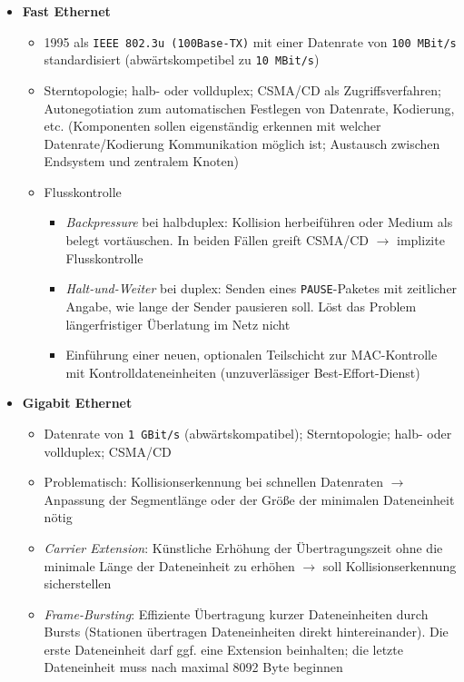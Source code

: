 \begin{itemize}
	\item \textbf{Fast Ethernet}
	\begin{itemize}
		\item 1995 als \texttt{IEEE 802.3u (100Base-TX)} mit einer Datenrate von \texttt{100 MBit/s} standardisiert (abwärtskompetibel zu \texttt{10 MBit/s})
		\item Sterntopologie; halb- oder vollduplex; CSMA/CD als Zugriffsverfahren; Autonegotiation zum automatischen Festlegen von Datenrate, Kodierung, etc. (Komponenten sollen eigenständig erkennen mit welcher Datenrate/Kodierung Kommunikation möglich ist; Austausch zwischen Endsystem und zentralem Knoten)
		\item Flusskontrolle
		\begin{itemize}
			\item \textit{Backpressure} bei halbduplex: Kollision herbeiführen oder Medium als belegt vortäuschen. In beiden Fällen greift CSMA/CD \(\rightarrow\) implizite Flusskontrolle
			\item \textit{Halt-und-Weiter} bei duplex: Senden eines \texttt{PAUSE}-Paketes mit zeitlicher Angabe, wie lange der Sender pausieren soll. Löst das Problem längerfristiger Überlatung im Netz nicht
			\item Einführung einer neuen, optionalen Teilschicht zur MAC-Kontrolle mit Kontrolldateneinheiten (unzuverlässiger Best-Effort-Dienst)
		\end{itemize}
	\end{itemize}
	\item \textbf{Gigabit Ethernet}
	\begin{itemize}
		\item Datenrate von \texttt{1 GBit/s} (abwärtskompatibel); Sterntopologie; halb- oder vollduplex; CSMA/CD
		\item Problematisch: Kollisionserkennung bei schnellen Datenraten \(\rightarrow\) Anpassung der Segmentlänge oder der Größe der minimalen Dateneinheit nötig
		\item \textit{Carrier Extension}: Künstliche Erhöhung der Übertragungszeit ohne die minimale Länge der Dateneinheit zu erhöhen \(\rightarrow\) soll Kollisionserkennung sicherstellen
		\item \textit{Frame-Bursting}: Effiziente Übertragung kurzer Dateneinheiten durch Bursts (Stationen übertragen Dateneinheiten direkt hintereinander). Die erste Dateneinheit darf ggf. eine Extension beinhalten; die letzte Dateneinheit muss nach maximal 8092 Byte beginnen

\end{itemize}
\end{itemize}
